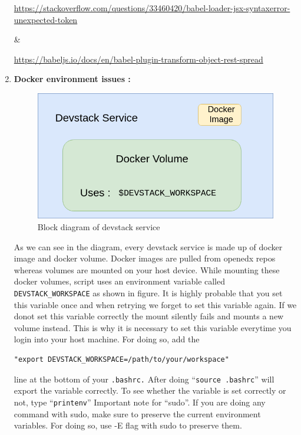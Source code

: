 \begin{enumerate}
\begin{small}\url {https://stackoverflow.com/questions/33460420/babel-loader-jsx-syntaxerror-unexpected-token}\end{small} \& \newline
\begin{small}\url{https://babeljs.io/docs/en/babel-plugin-transform-object-rest-spread}\end{small}
	\item \textbf{Docker environment issues :} \newline
	\begin{figure}
		\includegraphics[width=\linewidth]{images/devstack_arch.png}
		\caption{Block diagram of devstack service}
	\end{figure}
As we can see in the diagram, every devstack service is made up of docker image and docker
volume. Docker images are pulled from openedx repos whereas volumes are mounted on your host
device. While mounting these docker volumes, script uses an environment variable called 
\verb=DEVSTACK_WORKSPACE= as shown in figure. It is highly probable that you set this variable
once and when retrying we forget to set this variable again. If we donot set this variable correctly
the mount silently fails and mounts a new volume instead. This is why it is necessary to set this
variable everytime you login into your host machine. For doing so, add the 
	\begin{center}
	\begin{verbatim}"export DEVSTACK_WORKSPACE=/path/to/your/workspace"
	\end{verbatim}
	\end{center} line at the bottom of your \verb=.bashrc.=
After doing “\verb=source .bashrc=” will export the variable correctly. To see whether the variable is set
correctly or not, type “\verb=printenv=”\newline
Important note for “sudo”. If you are doing any command with sudo, make sure to preserve the
current environment variables. For doing so, use -E flag with sudo to preserve them.
	
	
\end{enumerate}

